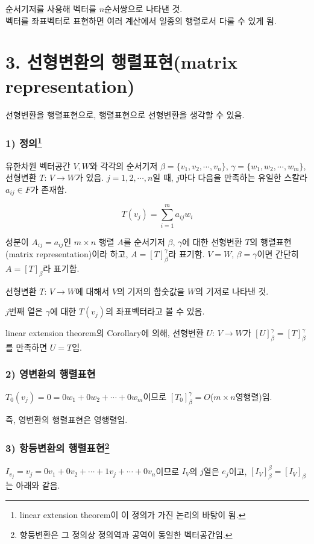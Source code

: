 \documentclass[10pt, a4paper]{article}
\begin{document}
순서기저를 사용해 벡터를 $n$순서쌍으로 나타낸 것.\\
벡터를 좌표벡터로 표현하면 여러 계산에서 일종의 행렬로서 다룰 수 있게 됨.\\

\newpage


\section*{3. 선형변환의 행렬표현(matrix representation)}

선형변환을 행렬표현으로, 행렬표현으로 선형변환을 생각할 수 있음.

\subsubsection*{1) 정의\footnote{linear extension theorem이 이 정의가 가진 논리의 바탕이 됨.}}
유한차원 벡터공간 $V,W$와 각각의 순서기저 $\beta = \{v_1,v_2, \cdots ,v_n\}$, $\gamma = \{w_1,w_2, \cdots ,w_m\}$, 선형변환 $T:\,V \rightarrow W$가 있음. $j=1,2, \cdots ,n$일 때, $j$마다 다음을 만족하는 유일한 스칼라 $a_{ij} \in F$가 존재함.

\[
T(v_{j})=\sum_{i=1}^{m}{a_{ij}w_i}
\]

성분이 $A_{ij}=a_{ij}$인 $m \times n$ 행렬 $A$를 순서기저 $\beta$, $\gamma$에 대한 선형변환 $T$의 행렬표현(matrix representation)이라 하고, $A=[T]_{\beta}^{\gamma}$라 표기함. $V=W$, $\beta=\gamma$이면 간단히 $A=[T]_{\beta}$라 표기함.

선형변환 $T:\,V \rightarrow W$에 대해서 $V$의 기저의 함숫값을 $W$의 기저로 나타낸 것.

$j$번째 열은 $\gamma$에 대한 $T(v_j)$의 좌표벡터라고 볼 수 있음.

linear extension theorem의 Corollary에 의해, 선형변환 $U:\,V \rightarrow W$가 $[U]_{\beta}^{\gamma}=[T]_{\beta}^{\gamma}$를 만족하면 $U=T$임.


\subsubsection*{2) 영변환의 행렬표현}
$T_{0}(v_j)=0=0w_1+0w_2+ \cdots +0w_m$이므로 $[T_{0}]_{\beta}^{\gamma}=O$($m \times n$영행렬)임.

즉, 영변환의 행렬표현은 영행렬임.

\subsubsection*{3) 항등변환의 행렬표현\footnote{항등변환은 그 정의상 정의역과 공역이 동일한 벡터공간임.}}
$I_{v_j}=v_j=0v_1+0v_2+ \cdots +1v_j+ \cdots +0v_n$이므로 $I_V$의 $j$열은 $e_j$이고, $[I_{V}]_{\beta}^{\beta}=[I_{V}]_{\beta}$는 아래와 같음.
\end{document}
